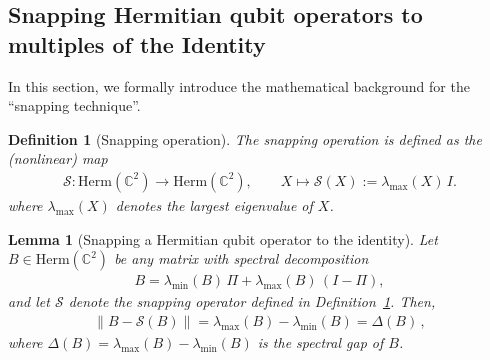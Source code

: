 \documentclass[a4paper,onecolumn,11pt]{quantumarticle}
\theoremstyle{plain}
\newtheorem{lemma}[theorem]{Lemma}
\newtheorem{definition}[theorem]{Definition}
\begin{document}
\subsection{Snapping Hermitian qubit operators to multiples of the Identity}

In this section, we formally introduce the mathematical background for the ``snapping technique''.

\begin{definition}[Snapping operation]\label{def:snapping-operator}
The snapping operation is defined as the (nonlinear) map
\begin{align}
\mathcal{S} : \mathrm{Herm}(\mathbb{C}^{2}) \rightarrow \mathrm{Herm}(\mathbb{C}^{2}), \quad\quad X \mapsto \mathcal{S}(X) := \lambda_{\max}(X)\, I.
\end{align}
where $\lambda_{\max}(X)$ denotes the largest eigenvalue of $X$. 
\end{definition}
\begin{lemma}[Snapping a Hermitian qubit operator to the identity]\label{lemma:snapping-hermitian-qubit-hermitian-operator}
Let $B \in \mathrm{Herm}(\mathbb{C}^{2})$ be any matrix with spectral decomposition
\begin{align}
B = \lambda_{\min}(B)\,\Pi + \lambda_{\max}(B)\,(I-\Pi),
\end{align}
and let $\mathcal{S}$ denote the snapping operator defined in Definition~\ref{def:snapping-operator}. Then,
\begin{align}
\|B - \mathcal{S}(B)\|
= \lambda_{\max}(B) - \lambda_{\min}(B) = \Delta(B) \, ,
\end{align}
where $\Delta(B) = \lambda_{\max}(B) - \lambda_{\min}(B)$ is the spectral gap of $B$.
\end{lemma}
\end{document}
